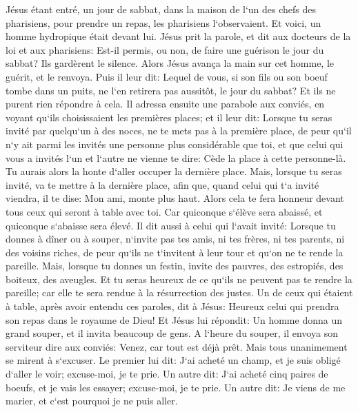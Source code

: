 \verse Jésus étant entré, un jour de sabbat, dans la maison de l`un des chefs des pharisiens, pour prendre un repas, les pharisiens l`observaient. 
\verse Et voici, un homme hydropique était devant lui. 
\verse Jésus prit la parole, et dit aux docteurs de la loi et aux pharisiens: Est-il permis, ou non, de faire une guérison le jour du sabbat? 
\verse Ils gardèrent le silence. Alors Jésus avança la main sur cet homme, le guérit, et le renvoya. 
\verse Puis il leur dit: Lequel de vous, si son fils ou son boeuf tombe dans un puits, ne l`en retirera pas aussitôt, le jour du sabbat? 
\verse Et ils ne purent rien répondre à cela. 
\verse Il adressa ensuite une parabole aux conviés, en voyant qu`ils choisissaient les premières places; et il leur dit: 
\verse Lorsque tu seras invité par quelqu`un à des noces, ne te mets pas à la première place, de peur qu`il n`y ait parmi les invités une personne plus considérable que toi, 
\verse et que celui qui vous a invités l`un et l`autre ne vienne te dire: Cède la place à cette personne-là. Tu aurais alors la honte d`aller occuper la dernière place. 
\verse Mais, lorsque tu seras invité, va te mettre à la dernière place, afin que, quand celui qui t`a invité viendra, il te dise: Mon ami, monte plus haut. Alors cela te fera honneur devant tous ceux qui seront à table avec toi. 
\verse Car quiconque s`élève sera abaissé, et quiconque s`abaisse sera élevé. 
\verse Il dit aussi à celui qui l`avait invité: Lorsque tu donnes à dîner ou à souper, n`invite pas tes amis, ni tes frères, ni tes parents, ni des voisins riches, de peur qu`ils ne t`invitent à leur tour et qu`on ne te rende la pareille. 
\verse Mais, lorsque tu donnes un festin, invite des pauvres, des estropiés, des boiteux, des aveugles. 
\verse Et tu seras heureux de ce qu`ils ne peuvent pas te rendre la pareille; car elle te sera rendue à la résurrection des justes. 
\verse Un de ceux qui étaient à table, après avoir entendu ces paroles, dit à Jésus: Heureux celui qui prendra son repas dans le royaume de Dieu! 
\verse Et Jésus lui répondit: Un homme donna un grand souper, et il invita beaucoup de gens. 
\verse A l`heure du souper, il envoya son serviteur dire aux conviés: Venez, car tout est déjà prêt. 
\verse Mais tous unanimement se mirent à s`excuser. Le premier lui dit: J`ai acheté un champ, et je suis obligé d`aller le voir; excuse-moi, je te prie. 
\verse Un autre dit: J`ai acheté cinq paires de boeufs, et je vais les essayer; excuse-moi, je te prie. 
\verse Un autre dit: Je viens de me marier, et c`est pourquoi je ne puis aller. 
